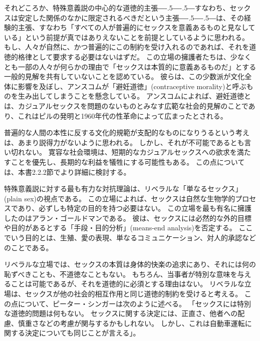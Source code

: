\documentclass[paper=a4,book,openany]{jlreq}
\newcommand{\ig}[1]{}           %
\def\DDASH{―\kern-.5\zw―\kern-.5\zw―} %
\begin{document}
それどころか、特殊意義説の中心的な道徳的主張{\DDASH}すなわち、セックスは安定した関係のなかに限定されるべきだという主張{\DDASH}は、その経験的主張、すなわち「すべての人が普遍的にセックスを意義あるものと見なしている」という前提が真ではありえないことを前提としているように思われる。
もし、人々が自然に、かつ普遍的にこの制約を受け入れるのであれば、それを道徳的格律として要求する必要はないはずだ。
この立場の擁護者たちは、少なくとも一部の人々が何らかの理由で「セックスは本質的に意義あるものだ」とする一般的見解を共有していないことを認めている。
彼らは、この少数派が文化全体に影響を及ぼし、アンスコムが「避妊道徳」(contraceptive morality)と呼ぶものを生み出してしまうことを懸念している。
アンスコムによれば、避妊道徳とは、カジュアルセックスを問題のないものとみなす広範な社会的見解のことであり、これはピルの発明と1960年代の性革命によって広まったとされる。

普遍的な人間の本性に反する文化的規範が支配的なものになりうるという考えは、あまり説得力がないように思われる。
しかし、それが不可能であるとも言い切れない。
寛容な社会環境は、短期的なカジュアルセックスへの欲求を満たすことを優先し、長期的な利益を犠牲にする可能性もある。
この点については、本書2.2.2節でより詳細に検討する。

特殊意義説に対する最も有力な対抗理論は、リベラルな「単なるセックス」(plain sex)の視点である。
この立場によれば、セックスは自然な生物学的プロセスであり、必ずしも特定の目的を持つ必要はない。
この立場を最も有名に擁護したのはアラン・ゴールドマンである。
彼は、セックスには必然的な外的目標や目的があるとする「手段・目的分析」(means-end analysis)を否定する。
ここでいう目的とは、生殖、愛の表現、単なるコミュニケーション、対人的承認などのことである\citep{goldman77:_plain_sex}\ig{Alan Goldman}。

リベラルな立場では、セックスの本質は身体的快楽の追求にあり、それには何の恥ずべきことも、不道徳なこともない。
もちろん、当事者が特別な意味を与えることは可能であるが、それを道徳的に必須とする理由はない。
リベラルな立場は、セックスが他の社会的相互作用と同じ道徳的制約を受けると考える。
この点について、ピーター・シンガーは次のように述べる。
「セックスには特別な道徳的問題は何もない。
セックスに関する決定には、正直さ、他者への配慮、慎重さなどの考慮が関与するかもしれない。
しかし、これは自動車運転に関する決定についても同じことが言える」\citep[p.2]{singer79:_pract_ethic}。
\end{document}
